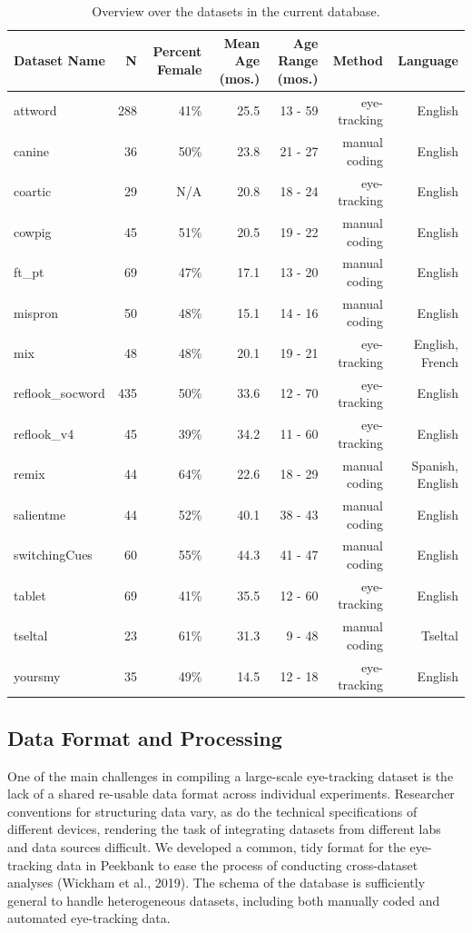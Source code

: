 \documentclass[10pt, letterpaper]{article}
\begin{document}
\begin{table}[ht]
\centering
\begingroup\fontsize{9pt}{10pt}\selectfont
\begin{tabular}{lrrrrrr}
  \hline
Dataset Name & N & Percent Female & Mean Age (mos.) & Age Range (mos.) & Method & Language \\ 
  \hline
attword & 288 & 41\% & 25.5 & 13 - 59 & eye-tracking & English \\ 
  canine & 36 & 50\% & 23.8 & 21 - 27 & manual coding & English \\ 
  coartic & 29 & N/A & 20.8 & 18 - 24 & eye-tracking & English \\ 
  cowpig & 45 & 51\% & 20.5 & 19 - 22 & manual coding & English \\ 
  ft\_pt & 69 & 47\% & 17.1 & 13 - 20 & manual coding & English \\ 
  mispron & 50 & 48\% & 15.1 & 14 - 16 & manual coding & English \\ 
  mix & 48 & 48\% & 20.1 & 19 - 21 & eye-tracking & English, French \\ 
  reflook\_socword & 435 & 50\% & 33.6 & 12 - 70 & eye-tracking & English \\ 
  reflook\_v4 & 45 & 39\% & 34.2 & 11 - 60 & eye-tracking & English \\ 
  remix & 44 & 64\% & 22.6 & 18 - 29 & manual coding & Spanish, English \\ 
  salientme & 44 & 52\% & 40.1 & 38 - 43 & manual coding & English \\ 
  switchingCues & 60 & 55\% & 44.3 & 41 - 47 & manual coding & English \\ 
  tablet & 69 & 41\% & 35.5 & 12 - 60 & eye-tracking & English \\ 
  tseltal & 23 & 61\% & 31.3 & 9 - 48 & manual coding & Tseltal \\ 
  yoursmy & 35 & 49\% & 14.5 & 12 - 18 & eye-tracking & English \\ 
   \hline
\end{tabular}
\endgroup
\caption{Overview over the datasets in the current database.} 
\end{table}

\hypertarget{data-format-and-processing}{%
\subsection{Data Format and
Processing}\label{data-format-and-processing}}

One of the main challenges in compiling a large-scale eye-tracking
dataset is the lack of a shared re-usable data format across individual
experiments. Researcher conventions for structuring data vary, as do the
technical specifications of different devices, rendering the task of
integrating datasets from different labs and data sources difficult. We
developed a common, tidy format for the eye-tracking data in Peekbank to
ease the process of conducting cross-dataset analyses (Wickham et al.,
2019). The schema of the database is sufficiently general to handle
heterogeneous datasets, including both manually coded and automated
eye-tracking data.
\end{document}
